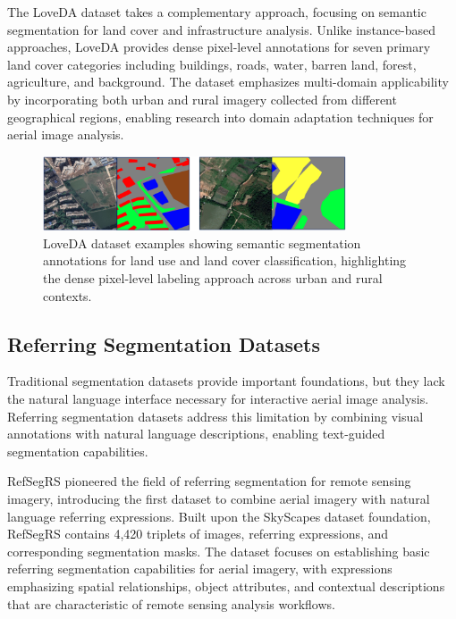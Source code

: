 The LoveDA dataset takes a complementary approach, focusing on semantic segmentation for land cover and infrastructure analysis. Unlike instance-based approaches, LoveDA provides dense pixel-level annotations for seven primary land cover categories including buildings, roads, water, barren land, forest, agriculture, and background. The dataset emphasizes multi-domain applicability by incorporating both urban and rural imagery collected from different geographical regions, enabling research into domain adaptation techniques for aerial image analysis.

\begin{figure}[htbp]
\centering
\includegraphics[width=0.8\textwidth]{Images/loveda.png}
\caption{LoveDA dataset examples showing semantic segmentation annotations for land use and land cover classification, highlighting the dense pixel-level labeling approach across urban and rural contexts.}
\label{fig:loveda_examples}
\end{figure}

\subsection{Referring Segmentation Datasets}

Traditional segmentation datasets provide important foundations, but they lack the natural language interface necessary for interactive aerial image analysis. Referring segmentation datasets address this limitation by combining visual annotations with natural language descriptions, enabling text-guided segmentation capabilities.

RefSegRS pioneered the field of referring segmentation for remote sensing imagery, introducing the first dataset to combine aerial imagery with natural language referring expressions. Built upon the SkyScapes dataset foundation, RefSegRS contains 4,420 triplets of images, referring expressions, and corresponding segmentation masks. The dataset focuses on establishing basic referring segmentation capabilities for aerial imagery, with expressions emphasizing spatial relationships, object attributes, and contextual descriptions that are characteristic of remote sensing analysis workflows.

